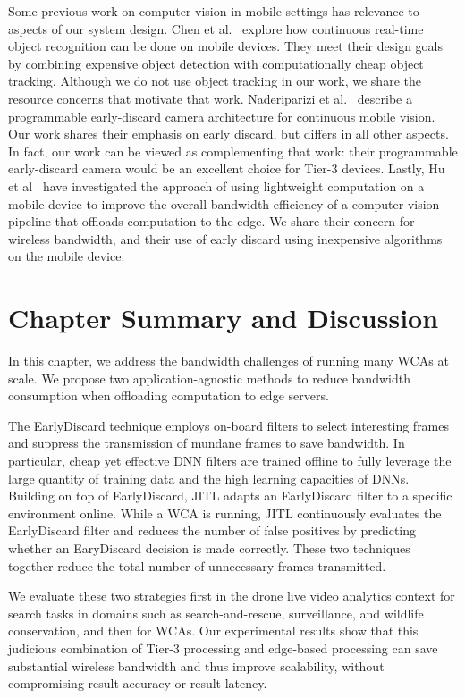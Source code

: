 Some previous work on computer vision in mobile settings has relevance to
aspects of our system design.  Chen et al.~\cite{chen2015glimpse} explore how
continuous real-time object recognition can be done on mobile devices. They meet
their design goals by combining expensive object detection with computationally
cheap object tracking.  Although we do not use object tracking in our work, we
share the resource concerns that motivate that work.  Naderiparizi et
al.~\cite{naderiparizi2017glimpse} describe a programmable early-discard camera
architecture for continuous mobile vision.  Our work shares their emphasis on
early discard, but differs in all other aspects.  In fact, our work can be
viewed as complementing that work: their programmable early-discard camera would
be an excellent choice for Tier-3 devices. Lastly, Hu et al~\cite{Hu2015} have
investigated the approach of using lightweight computation on a mobile device to
improve the overall bandwidth efficiency of a computer vision pipeline that
offloads computation to the edge.  We share their concern for wireless
bandwidth, and their use of early discard using inexpensive algorithms on the
mobile device.

\section{Chapter Summary and Discussion}
\label{bw:discussion}

In this chapter, we address the bandwidth challenges of running many WCAs at
scale. We propose two application-agnostic methods to reduce bandwidth
consumption when offloading computation to edge servers. 

The EarlyDiscard technique employs on-board filters to select interesting frames
and suppress the transmission of mundane frames to save bandwidth. In
particular, cheap yet effective DNN filters are trained offline to fully
leverage the large quantity of training data and the high learning capacities of
DNNs. Building on top of EarlyDiscard, JITL adapts an EarlyDiscard filter to a
specific environment online. While a WCA is running, JITL continuously evaluates
the EarlyDiscard filter and reduces the number of false positives by predicting
whether an EaryDiscard decision is made correctly. These two techniques together
reduce the total number of unnecessary frames transmitted. 

We evaluate these two strategies first in the drone live video analytics context
for search tasks in domains such as search-and-rescue, surveillance, and
wildlife conservation, and then for WCAs. Our experimental results show that
this judicious combination of Tier-3 processing and edge-based processing can
save substantial wireless bandwidth and thus improve scalability, without
compromising result accuracy or result latency. 
